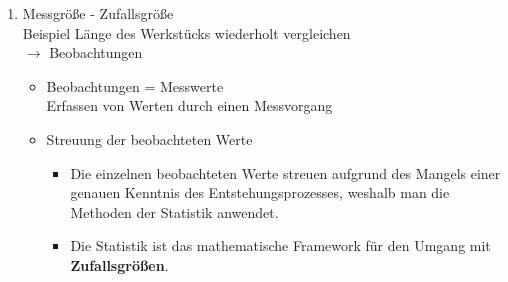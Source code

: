\begin{raggedright}
\begin{enumerate}
\begin{itemize}
			\url{https://zenodo.org/record/22826#.W8bufN0zZhE}

			Die Daten werden aus internationalen Vergleichsmessungen gewonnen.

			Das amerikanische Staatsinstitut gibt einen Überblick über die aktuellsten Veröffentlichungen von CODATA:
			
			\url{https://www.nist.gov/programs-projects/codata-values-fundamental-physical-constants}

			Im Jahr 2022 wurde eine Aktualisierung herausgegeben:

			\url{https://tsapps.nist.gov/publication/get_pdf.cfm?pub_id=958143}
	\end{itemize}
\item Messgröße - Zufallsgröße\\
Beispiel Länge des Werkstücks wiederholt vergleichen\\
$\rightarrow$ Beobachtungen
\begin{itemize}
	\item Beobachtungen = Messwerte\\
		Erfassen von Werten durch einen Messvorgang
	\item Streuung der beobachteten Werte
		\begin{itemize}
		\item Die einzelnen beobachteten Werte streuen aufgrund des Mangels einer genauen
		Kenntnis des Entstehungsprozesses, weshalb man die Methoden der Statistik anwendet.
		\item Die Statistik ist das mathematische Framework für den Umgang mit \textbf{Zufallsgrößen}.
	\end{itemize}


\end{itemize}
\end{enumerate}
\end{raggedright}
